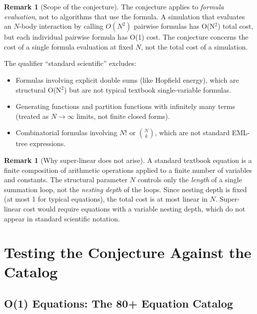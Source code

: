 \documentclass[12pt,a4paper]{article}
\theoremstyle{definition}
\newtheorem{remark}[theorem]{Remark}
\begin{document}
\begin{remark}[Scope of the conjecture]
The conjecture applies to \emph{formula evaluation}, not to algorithms
that use the formula.  A simulation that evaluates an $N$-body
interaction by calling $O(N^2)$ pairwise formulas has O(N$^2$) total
cost, but each individual pairwise formula has O(1) cost.  The
conjecture concerns the cost of a single formula evaluation at fixed
$N$, not the total cost of a simulation.

The qualifier ``standard scientific'' excludes:
\begin{itemize}
  \item Formulas involving explicit double sums (like Hopfield energy),
        which are structural O(N$^2$) but are not typical textbook
        single-variable formulas.
  \item Generating functions and partition functions with infinitely many
        terms (treated as $N \to \infty$ limits, not finite closed forms).
  \item Combinatorial formulas involving $N!$ or $\binom{N}{k}$,
        which are not standard EML-tree expressions.
\end{itemize}
\end{remark}

\begin{remark}[Why super-linear does not arise]
A standard textbook equation is a finite composition of arithmetic
operations applied to a finite number of variables and constants.
The structural parameter $N$ controls only the \emph{length} of a
single summation loop, not the \emph{nesting depth} of the loops.
Since nesting depth is fixed (at most 1 for typical equations),
the total cost is at most linear in $N$.  Super-linear cost would
require equations with a variable nesting depth, which do not appear
in standard scientific notation.
\end{remark}

\section{Testing the Conjecture Against the Catalog}
\label{sec:catalog_test}

\subsection{O(1) Equations: The 80+ Equation Catalog}
\end{document}
